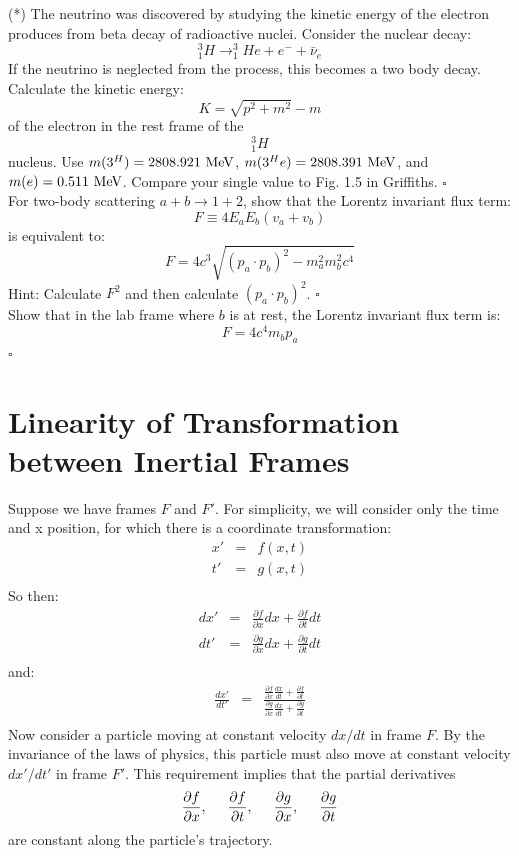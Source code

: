 \documentclass[12pt]{article}
\begin{document}
\exercise (*)
The neutrino was discovered by studying the kinetic energy of the
electron produces from beta decay of radioactive nuclei.  Consider the
nuclear decay:
$$^3_1H \to ^3_1He + e^- + \bar{\nu}_e$$
If the neutrino is neglected from the process, this becomes a two body decay.  Calculate the kinetic energy:
$$K = \sqrt{p^2+m^2} - m$$
of the electron in the rest frame of the $$^3_1H$$ nucleus.  Use $m(3^H)=2808.921~\rm MeV$, 
$m(3^He)=2808.391~\rm MeV$, and $m(e) = 0.511~\rm MeV$. Compare your single value to Fig. 1.5 in Griffiths.
$\square$ \\[3pt]

\exercise
For two-body scattering $a + b \to 1 + 2$, show that the Lorentz invariant flux term:
$$F \equiv 4 E_a E_b (v_a + v_b)$$
is equivalent to:
$$F = 4 c^3 \sqrt{ (p_a \cdot p_b)^2 - m_a^2 m_b^2 c^4 } $$
Hint: Calculate $F^2$ and then calculate $(p_a \cdot p_b)^2$.
 $\square$ \\[3pt]


\exercise
Show that in the lab frame where $b$ is at rest, the Lorentz invariant flux term is:
$$F = 4 c^4 m_b p_a$$ $\square$ \\[3pt]



\appendix

\section{Linearity of Transformation between Inertial Frames}

Suppose we have frames $F$ and $F'$.  For simplicity, we
will consider only the time and x position, for which there is a
coordinate transformation:
\begin{eqnarray*}
x' &=& f(x,t)\\
t' &=& g(x,t)\\
\end{eqnarray*}
So then:
\begin{eqnarray*}
dx' &=& \frac{\partial f}{\partial x}dx + \frac{\partial f}{\partial t}dt \\
dt' &=& \frac{\partial g}{\partial x}dx + \frac{\partial g}{\partial t}dt \\
\end{eqnarray*}
and:
\begin{eqnarray*}
\frac{dx'}{dt'} &=&
\frac{\displaystyle \frac{\partial f}{\partial x}\frac{dx}{dt} + \frac{\partial f}{\partial t}}
{\displaystyle \frac{\partial g}{\partial x}\frac{dx}{dt} + \frac{\partial g}{\partial t}}\\
\end{eqnarray*}
Now consider a particle moving at constant velocity $dx/dt$ in frame
$F$.  By the invariance of the laws of physics, this particle must
also move at constant velocity $dx'/dt'$ in frame $F'$.  This
requirement implies that the partial derivatives
$$
\frac{\partial f}{\partial
  x}, \hspace{0.5cm}\frac{\partial f}{\partial
  t}, \hspace{0.5cm}\frac{\partial g}{\partial
  x}, \hspace{0.5cm}\frac{\partial g}{\partial t}
$$
are constant along the particle's trajectory.
\end{document}
